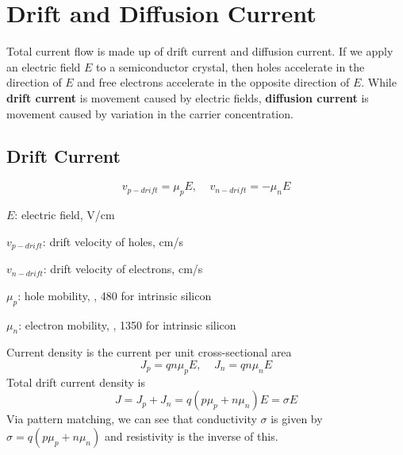 \chapter{Drift and Diffusion Current}
Total current flow is made up of drift current and diffusion current. If we apply an electric field $E$ to a semiconductor crystal, then holes accelerate in the direction of $E$ and free electrons accelerate in the opposite direction of $E$. While \textbf{drift current} is movement caused by electric fields, \textbf{diffusion current} is movement caused by variation in the carrier concentration. 

\section{Drift Current}
    \[v_{p-drift} = \mu_p E, ~~~~~ v_{n-drift} = - \mu_n E\]

\begin{gline}
    \item $E$: electric field, V/cm
    \item $v_{p-drift}$: drift velocity of holes, cm/s
    \item $v_{n-drift}$: drift velocity of electrons, cm/s
    \item $\mu_p$: hole mobility, \unit{\mobility}, \qty{480}{\mobility} for intrinsic silicon
    \item $\mu_n$: electron mobility, \unit{\mobility}, \qty{1350}{\mobility} for intrinsic silicon
\end{gline}

Current density is the current per unit cross-sectional area
    \[J_p = qn\mu_p E, ~~~~~ J_n = qn\mu_n E\]
Total drift current density is
    \[J = J_p + J_n = q(p\mu_p + n\mu_n) E = \sigma E\]
Via pattern matching, we can see that conductivity $\sigma$ is given by $\sigma = q(p\mu_p + n\mu_n)$ and resistivity is the inverse of this.

